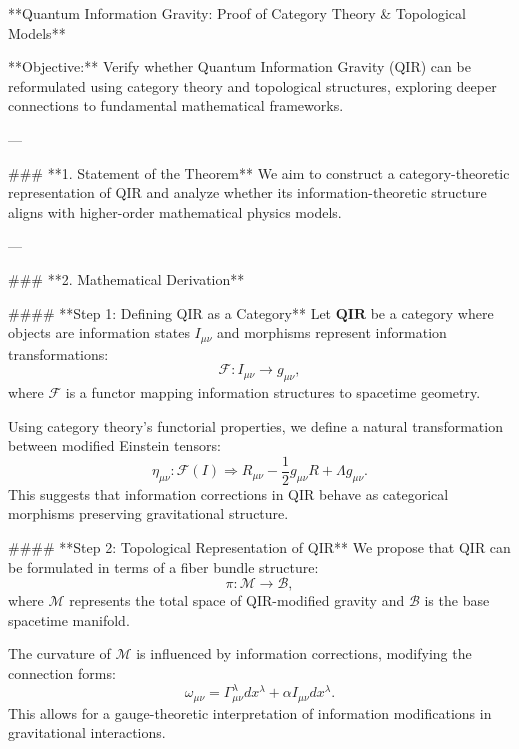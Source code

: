 **Quantum Information Gravity: Proof of Category Theory & Topological Models**

**Objective:** Verify whether Quantum Information Gravity (QIR) can be reformulated using category theory and topological structures, exploring deeper connections to fundamental mathematical frameworks.

---

### **1. Statement of the Theorem**
We aim to construct a category-theoretic representation of QIR and analyze whether its information-theoretic structure aligns with higher-order mathematical physics models.

---

### **2. Mathematical Derivation**

#### **Step 1: Defining QIR as a Category**
Let \( \mathbf{QIR} \) be a category where objects are information states \( I_{\mu \nu} \) and morphisms represent information transformations:
\begin{equation}
    \mathcal{F}: I_{\mu \nu} \to g_{\mu \nu},
\end{equation}
where \( \mathcal{F} \) is a functor mapping information structures to spacetime geometry.

Using category theory’s functorial properties, we define a natural transformation between modified Einstein tensors:
\begin{equation}
    \eta_{\mu \nu}: \mathcal{F}(I) \Rightarrow R_{\mu \nu} - \frac{1}{2} g_{\mu \nu} R + \Lambda g_{\mu \nu}.
\end{equation}
This suggests that information corrections in QIR behave as categorical morphisms preserving gravitational structure.

#### **Step 2: Topological Representation of QIR**
We propose that QIR can be formulated in terms of a fiber bundle structure:
\begin{equation}
    \pi: \mathcal{M} \to \mathcal{B},
\end{equation}
where \( \mathcal{M} \) represents the total space of QIR-modified gravity and \( \mathcal{B} \) is the base spacetime manifold.

The curvature of \( \mathcal{M} \) is influenced by information corrections, modifying the connection forms:
\begin{equation}
    \omega_{\mu \nu} = \Gamma_{\mu \nu}^{\lambda} dx^{\lambda} + \alpha I_{\mu \nu} dx^{\lambda}.
\end{equation}
This allows for a gauge-theoretic interpretation of information modifications in gravitational interactions.

